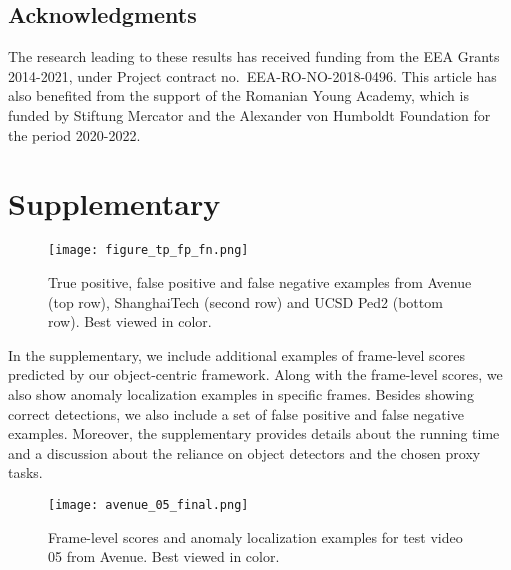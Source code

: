 \documentclass[final]{cvpr}
\begin{document}
\vspace{-0.1cm}
\subsection*{Acknowledgments}
\vspace{-0.1cm}
The research leading to these results has received funding from the EEA Grants 2014-2021, under Project contract no.~EEA-RO-NO-2018-0496. This article has also benefited from the support of the Romanian Young Academy, which is funded by Stiftung Mercator and the Alexander von Humboldt Foundation for the period 2020-2022.

{\small


}

\section{Supplementary}

\begin{figure*}[!th]
\begin{center}
\texttt{[image: figure\_tp\_fp\_fn.png]}
\end{center}
\vspace{-0.4cm}
\caption{True positive, false positive and false negative examples from Avenue (top row), ShanghaiTech (second row) and UCSD Ped2 (bottom row). Best viewed in color.}
\label{fig:tp}
\vspace{-0.1cm}
\end{figure*}

In the supplementary, we include additional examples of frame-level scores predicted by our object-centric framework. Along with the frame-level scores, we also show anomaly localization examples in specific frames. Besides showing correct detections, we also include a set of false positive and false negative examples. Moreover, the supplementary provides details about the running time and a discussion about the reliance on object detectors and the chosen proxy tasks.

\begin{figure*}[!t]
\begin{center}
\texttt{[image: avenue\_05\_final.png]}
\end{center}
\vspace{-0.4cm}
\caption{Frame-level scores and anomaly localization examples for test video 05 from Avenue. Best viewed in color.}
\label{fig:avenue_05}
\vspace{-0.1cm}
\end{figure*} 
\end{document}
